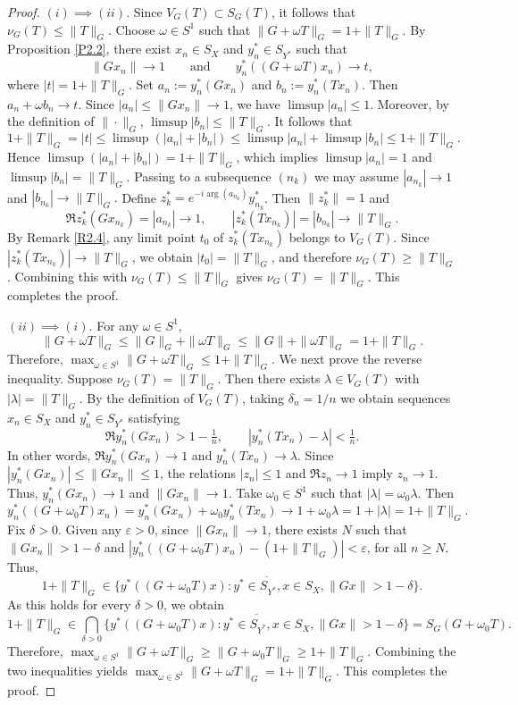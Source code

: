 \documentclass[12pt]{amsart}
\theoremstyle{definition}
\numberwithin{equation}{section}
\begin{document}
	\begin{proof}
		$(i)\implies (ii).$ Since $V_G(T)\subset S_G(T)$, it follows that $\nu_G(T)\le \|T\|_G.$ Choose $\omega\in S^1$ such that $\|G+\omega T\|_G=1+\|T\|_G$. By Proposition \ref{P2.2}, there exist $x_n\in S_X$ and $y_n^*\in S_{Y^*}$ such that
		\[
		\|Gx_n\|\to 1\qquad\text{and}\qquad y_n^*((G+\omega T)x_n)\to t,
		\]
		where $|t|=1+\|T\|_G$. Set $a_n:=y_n^*(Gx_n)$ and $b_n:=y_n^*(Tx_n).$ Then $a_n+\omega b_n\to t$. Since $|a_n|\le \|Gx_n\|\to1$, we have
		$\limsup |a_n|\le 1$. Moreover, by the definition of $\|\cdot\|_G$,
		$\limsup |b_n|\le \|T\|_G$. It follows that 
		\[
		1+\|T\|_G = |t| \le \limsup(|a_n|+|b_n|) \le \limsup|a_n|+\limsup|b_n| \le 1+\|T\|_G.
		\]
		Hence $\limsup(|a_n|+|b_n|)=1+\|T\|_G$, which implies $\limsup|a_n|=1$ and $\limsup|b_n|=\|T\|_G$. Passing to a subsequence $(n_k)$ we may assume $|a_{n_k}|\to 1$ and $|b_{n_k}|\to\|T\|_G.$ Define $z_k^*=e^{-i\arg(a_{n_k})}y_{n_k}^*$. Then $\|z_k^*\|=1$ and
		\[
		\Re z_k^*(Gx_{n_k})=|a_{n_k}|\to1, \qquad |z_k^*(Tx_{n_k})|=|b_{n_k}|\to\|T\|_G.
		\]
		By Remark \ref{R2.4}, any limit point $t_0$ of $z_k^*(Tx_{n_k})$ belongs to $V_G(T)$. Since $|z_k^*(Tx_{n_k})|\to\|T\|_G$, we obtain $|t_0|=\|T\|_G$, and therefore $\nu_G(T)\ge \|T\|_G$. Combining this with $\nu_G(T)\le \|T\|_G$ gives $\nu_G(T)=\|T\|_G.$ This completes the proof.
		
		
		\medskip
		
		
		$(ii)\implies (i).$ For any $\omega\in S^1$,
		\[
		\|G + \omega T\|_G \le \|G\|_G + \|\omega T\|_G \le \|G\| + \|\omega T\|_G = 1 + \|T\|_G.
		\]
		Therefore, $\max_{\omega \in S^1} \|G + \omega T\|_G \leq 1 + \|T\|_G.$ We next prove the reverse inequality. Suppose $\nu_G(T) = \|T\|_G$. Then there exists $\lambda \in V_G(T)$ with $|\lambda| = \|T\|_G$. By the definition of $V_G(T)$, taking $\delta_n=1/n$ we obtain sequences $x_n\in S_X$ and
		$y_n^*\in S_{Y^*}$ satisfying
		\[
		\Re y_n^*(Gx_n)>1-\tfrac1n,\qquad |y_n^*(Tx_n)-\lambda|<\tfrac1n.
		\]
		In other words, $\Re y_n^*(Gx_n) \to 1$ and $y_n^*(Tx_n) \to \lambda.$ Since $|y_n^*(Gx_n)|\le \|Gx_n\|\le 1$, the relations $|z_n|\le1$ and $\Re z_n\to 1$ imply $z_n\to1$. Thus, $y_n^*(Gx_n)\to 1$ and $\|Gx_n\|\to 1$. Take $\omega_0\in S^1$ such that $|\lambda|=\omega_0\lambda$. Then
		\[
		y_n^*((G + \omega_0 T)x_n) = y_n^*(Gx_n) + \omega_0 y_n^*(Tx_n) \to 1 + \omega_0\lambda = 1 + |\lambda| = 1 + \|T\|_G.
		\]
		Fix $\delta > 0$. Given any $\varepsilon>0$, since $\|Gx_n\| \to 1$, there exists $N$ such that $\|Gx_n\| > 1 - \delta$ and $|y_n^*((G + \omega_0 T)x_n) - (1 + \|T\|_G)| < \varepsilon$, for all $n \ge N$. Thus,  
		\[
		1 + \|T\|_G \in \overline{\{ y^*((G + \omega_0 T)x) : y^* \in S_{Y^*}, x \in S_X, \|Gx\| > 1 - \delta \}}.
		\]
		As this holds for every $\delta > 0$, we obtain
		\[
		1 + \|T\|_G \in \bigcap_{\delta > 0} \overline{\{ y^*((G + \omega_0 T)x) : y^* \in S_{Y^*}, x \in S_X, \|Gx\| > 1 - \delta \}} = S_G(G + \omega_0 T).
		\]
		Therefore, $\max_{\omega \in S^1} \|G + \omega T\|_G\geq \|G + \omega_0 T\|_G \ge 1 + \|T\|_G$. Combining the two inequalities yields $\max_{\omega \in S^1} \|G + \omega T\|_G = 1 + \|T\|_G$. This completes the proof.
	\end{proof}
	
\end{document}
